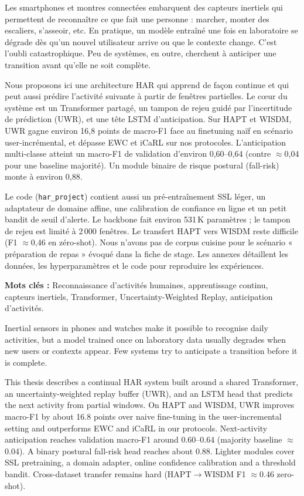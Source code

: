 

Les smartphones et montres connectées embarquent des capteurs inertiels qui
permettent de reconnaître ce que fait une personne : marcher, monter des
escaliers, s'asseoir, etc. En pratique, un modèle entraîné une fois en
laboratoire se dégrade dès qu'un nouvel utilisateur arrive ou que le contexte
change. C'est l'oubli catastrophique. Peu de systèmes, en outre, cherchent à
anticiper une transition avant qu'elle ne soit complète.

Nous proposons ici une architecture HAR qui apprend de façon continue et qui
peut aussi prédire l'activité suivante à partir de fenêtres partielles. Le
cœur du système est un Transformer partagé, un tampon de rejeu guidé par
l'incertitude de prédiction (UWR), et une tête LSTM d'anticipation. Sur
HAPT et WISDM, UWR gagne environ 16,8 points de macro-F1 face au finetuning
naïf en scénario user-incrémental, et dépasse EWC et iCaRL sur nos protocoles.
L'anticipation multi-classe atteint un macro-F1 de validation d'environ
0,60--0,64 (contre $\approx$0,04 pour une baseline majorité). Un module
binaire de risque postural (fall-risk) monte à environ 0,88.

Le code (\texttt{har\_project}) contient aussi un pré-entraînement SSL léger,
un adaptateur de domaine affine, une calibration de confiance en ligne et un
petit bandit de seuil d'alerte. Le backbone fait environ 531\,K paramètres ;
le tampon de rejeu est limité à 2\,000 fenêtres. Le transfert HAPT vers WISDM
reste difficile (F1 $\approx$0,46 en zéro-shot). Nous n'avons pas de corpus
cuisine pour le scénario « préparation de repas » évoqué dans la fiche de
stage. Les annexes détaillent les données, les hyperparamètres et le code
pour reproduire les expériences.

\bigskip
\noindent\textbf{Mots clés :} Reconnaissance d'activités humaines, apprentissage
continu, capteurs inertiels, Transformer, Uncertainty-Weighted Replay, anticipation
d'activités.

\clearpage



Inertial sensors in phones and watches make it possible to recognise daily
activities, but a model trained once on laboratory data usually degrades when
new users or contexts appear. Few systems try to anticipate a transition
before it is complete.

This thesis describes a continual HAR system built around a shared Transformer,
an uncertainty-weighted replay buffer (UWR), and an LSTM head that predicts the
next activity from partial windows. On HAPT and WISDM, UWR improves macro-F1 by
about 16.8 points over naive fine-tuning in the user-incremental setting and
outperforms EWC and iCaRL in our protocols. Next-activity anticipation reaches
validation macro-F1 around 0.60--0.64 (majority baseline $\approx$0.04). A
binary postural fall-risk head reaches about 0.88. Lighter modules cover SSL
pretraining, a domain adapter, online confidence calibration and a threshold
bandit. Cross-dataset transfer remains hard (HAPT$\rightarrow$WISDM F1
$\approx$0.46 zero-shot).

